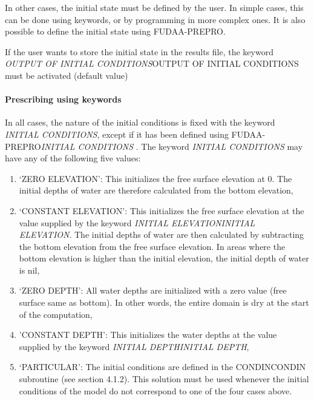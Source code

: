\documentclass{article} %
\begin{document}
 In other cases, the initial state must be defined by the user. In simple cases, this can be done using keywords, or by programming in more complex ones. It is also possible to define the initial state using FUDAA-PREPRO.

 If the user wants to store the initial state in the results file, the keyword \textit{OUTPUT OF INITIAL CONDITIONS}OUTPUT OF INITIAL CONDITIONS must be activated (default value)


\paragraph{ Prescribing using keywords}

 In all cases, the nature of the initial conditions is fixed with the keyword \textit{INITIAL CONDITIONS}, except if it has been defined using FUDAA-PREPRO\textit{INITIAL CONDITIONS }. The keyword \textit{INITIAL CONDITIONS} may have any of the following five values:

\begin{enumerate}
\item  `ZERO ELEVATION': This initializes the free surface elevation at 0. The initial depths of water are therefore calculated from the bottom elevation,

\item  `CONSTANT ELEVATION': This initializes the free surface elevation at the value supplied by the keyword \textit{INITIAL ELEVATIONINITIAL ELEVATION}. The initial depths of water are then calculated by subtracting the bottom elevation from the free surface elevation. In areas where the bottom elevation is higher than the initial elevation, the initial depth of water is nil,

\item  `ZERO DEPTH': All water depths are initialized with a zero value (free surface same as bottom). In other words, the entire domain is dry at the start of the computation,

\item  'CONSTANT DEPTH': This initializes the water depths at the value supplied by the keyword \textit{INITIAL DEPTHINITIAL DEPTH},

\item  `PARTICULAR': The initial conditions are defined in the CONDINCONDIN subroutine (see section 4.1.2). This solution must be used whenever the initial conditions of the model do not correspond to one of the four cases above.
\end{enumerate}
\end{document}

